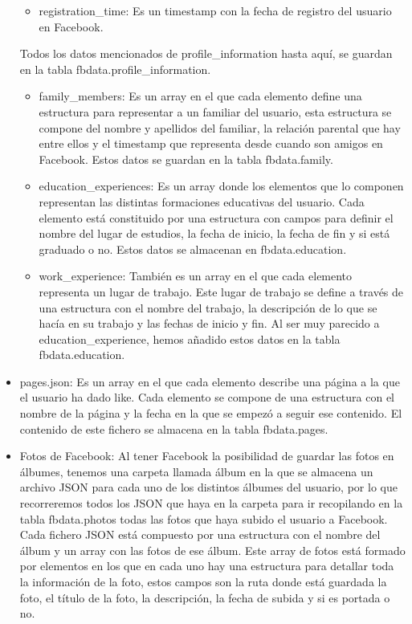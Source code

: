 \begin{itemize}
\begin{itemize}
		\item registration\_time: Es un timestamp con la fecha de registro del usuario en Facebook.
	\end{itemize}

	Todos los datos mencionados de profile\_information hasta aquí, se guardan en la tabla fbdata.profile\_information.
		
	\begin{itemize}
		\item family\_members: Es un array en el que cada elemento define una estructura para representar a un familiar del usuario, esta estructura se compone del nombre y apellidos del familiar, la relación parental que hay entre ellos y el timestamp que representa desde cuando son amigos en Facebook. Estos datos se guardan en la tabla fbdata.family.
		
		\item education\_experiences: Es un array donde los elementos que lo componen representan las distintas formaciones educativas del usuario. Cada elemento está constituido por una estructura con campos para definir el nombre del lugar de estudios, la fecha de inicio, la fecha de fin y si está graduado o no. Estos datos se almacenan en fbdata.education.
		
		\item work\_experience: También es un array en el que cada elemento representa un lugar de trabajo. Este lugar de trabajo se define a través de una estructura con el nombre del trabajo, la descripción de lo que se hacía en su trabajo y las fechas de inicio y fin. Al ser muy parecido a education\_experience, hemos añadido estos datos en la tabla fbdata.education.
		
	\end{itemize}

		\item pages.json: Es un array en el que cada elemento describe una página a la que el usuario ha dado like. Cada elemento se compone de una estructura con el nombre de la página y la fecha en la que se empezó a seguir ese contenido. El contenido de este fichero se almacena en la tabla fbdata.pages.
	
		\item Fotos de Facebook: Al tener Facebook la posibilidad de guardar las fotos en álbumes, tenemos una carpeta llamada álbum en la que se almacena un archivo JSON para cada uno de los distintos álbumes del usuario, por lo que recorreremos todos los JSON que haya en la carpeta para ir recopilando en la tabla fbdata.photos todas las fotos que haya subido el usuario a Facebook. Cada fichero JSON está compuesto por una estructura con el nombre del álbum y un array con las fotos de ese álbum. Este array de fotos está formado por elementos en los que en cada uno hay una estructura para detallar toda la información de la foto, estos campos son la ruta donde está guardada la foto, el título de la foto, la descripción, la fecha de subida y si es portada o no.
	

\end{itemize}
